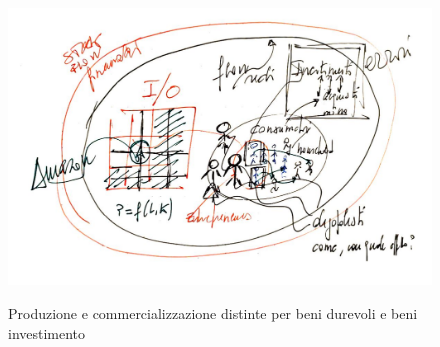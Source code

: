 \documentclass[]{beamer}
\begin{document}
\begin{frame}{~} %



\begin{figure}[H]
\center
\includegraphics[scale=0.50]{7.pdf}
\label{7}
\caption{Produzione e commercializzazione distinte per beni durevoli e beni investimento}
\end{figure}

\end{frame}
\end{document}
